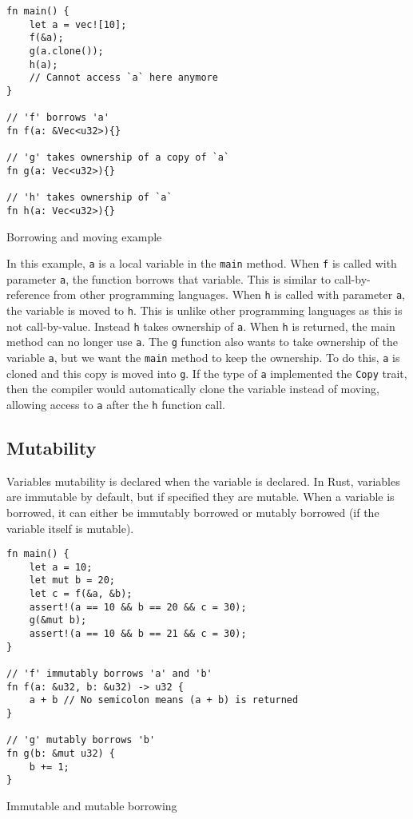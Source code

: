 \begin{code}
\begin{verbatim}
fn main() {
    let a = vec![10];
    f(&a);
    g(a.clone());
    h(a);
    // Cannot access `a` here anymore
}

// 'f' borrows 'a'
fn f(a: &Vec<u32>){}

// 'g' takes ownership of a copy of `a`
fn g(a: Vec<u32>){}

// 'h' takes ownership of `a`
fn h(a: Vec<u32>){}
\end{verbatim}
\caption{Borrowing and moving example}
\end{code}

In this example, \texttt{a} is a local variable in the \texttt{main} method.
When \texttt{f} is called with parameter \texttt{a}, the function borrows that variable. This is similar to call-by-reference from other programming languages.
When \texttt{h} is called with parameter \texttt{a}, the variable is moved to \texttt{h}. This is unlike other programming languages as this is not call-by-value. Instead \texttt{h} takes ownership of \texttt{a}. When \texttt{h} is returned, the main method can no longer use \texttt{a}.
The \texttt{g} function also wants to take ownership of the variable \texttt{a}, but we want the \texttt{main} method to keep the ownership. To do this, \texttt{a} is cloned and this copy is moved into \texttt{g}. If the type of \texttt{a} implemented the \texttt{Copy} trait, then the compiler would automatically clone the variable instead of moving, allowing access to \texttt{a} after the \texttt{h} function call.

\subsection{Mutability}
Variables mutability is declared when the variable is declared. In Rust, variables are immutable by default, but if specified they are mutable. When a variable is borrowed, it can either be immutably borrowed or mutably borrowed (if the variable itself is mutable).

\begin{code}
\begin{verbatim}
fn main() {
    let a = 10;
    let mut b = 20;
    let c = f(&a, &b);
    assert!(a == 10 && b == 20 && c = 30);
    g(&mut b);
    assert!(a == 10 && b == 21 && c = 30);
}

// 'f' immutably borrows 'a' and 'b'
fn f(a: &u32, b: &u32) -> u32 {
    a + b // No semicolon means (a + b) is returned
}

// 'g' mutably borrows 'b'
fn g(b: &mut u32) {
    b += 1;
}
\end{verbatim}
\caption{Immutable and mutable borrowing}
\end{code}

